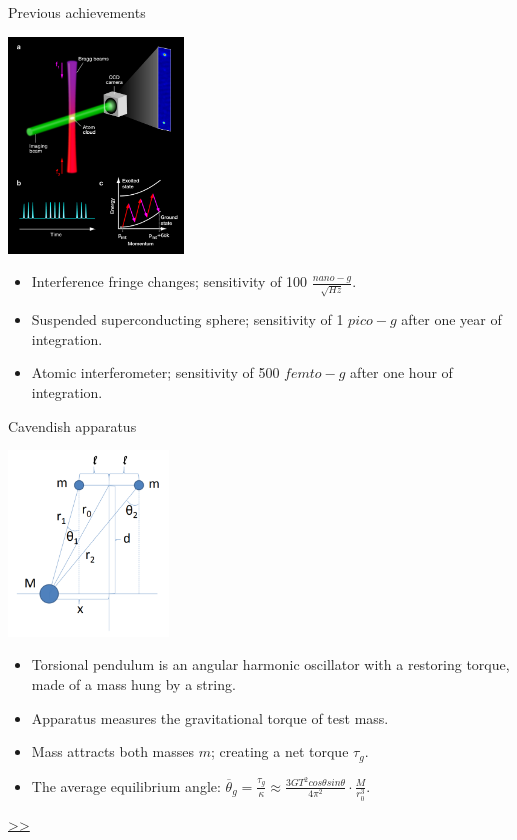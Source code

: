 \documentclass{beamer}
\begin{document}
\begin{frame}{Previous achievements}
	\begin{center}		
		\includegraphics[width=0.35\textwidth,keepaspectratio]{kasevich.png}
	\end{center}
	\begin{itemize}

		\item Interference fringe changes; sensitivity of 100 $\frac{nano-g}{\sqrt{Hz}}$.
		\item Suspended superconducting sphere; sensitivity of 1 $pico-g$ after one year of integration.
		\item Atomic interferometer; sensitivity of 500 $femto-g$ after one hour of integration.

		
	\end{itemize}
\end{frame}

\begin{frame}{\hypertarget{frame:Cavendish apparatus}{Cavendish apparatus}}
	\begin{center}		
		\includegraphics[width=0.32\textwidth,keepaspectratio]{Cavendish apparatus.PNG}
    \end{center}
	\begin{itemize}
		\item Torsional pendulum is an angular harmonic oscillator with a restoring torque, made of a mass hung by a string. 
		\item Apparatus measures the gravitational torque of test mass.
		\item Mass attracts both masses $m$; creating a net torque $\tau_g$.
		\item The average equilibrium angle: $\overline{\theta}_g = \frac{\tau_g}{\kappa} \approx \frac{3GT^2cos\theta sin\theta}{4\pi^2 } \cdot \frac{M}{r_0^3}$.

	\end{itemize}
	\hyperlink{frame:Cavendish apparatus 1}{>>} 
\end{frame}
\end{document}
